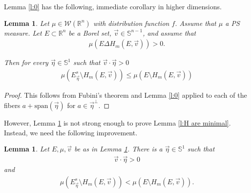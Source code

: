 \documentclass[12pt]{amsart}
\numberwithin{equation}{section}
\theoremstyle{plain}
\newtheorem{lemma}[theorem]{Lemma}
\theoremstyle{definition}
\begin{document}
Lemma \ref{l:0} has the following, immediate corollary in higher dimensions.

\begin{lemma}\label{l:1}
Let $\mu \in \mathscr{W}(\mathbb{R}^n)$ with distribution function $f$.  Assume that $\mu$ a PS measure.  Let $E \subset \mathbb{R}^n$ be a Borel set, $\vec{v} \in \mathbb{S}^{n-1}$, and assume that 
\begin{align*}
    \mu(E \Delta H_m(E, \vec{v}))>0.
\end{align*}

Then for every $\vec{\eta} \in \mathbb{S}^1$ such that $\vec{v} \cdot \vec{\eta}>0$
\begin{align}
    \mu(E^s_{\vec{\eta}} \setminus H_{m}(E, \vec{v})) \le \mu(E \setminus H_{m}(E, \vec{v})) 
\end{align}
\end{lemma}

\begin{proof}
    This follows from Fubini's theorem and Lemma \ref{l:0} applied to each of the fibers $a + \text{span}(\vec{\eta})$ for $a \in \vec{\eta}^{\perp}$.
\end{proof}

However, Lemma \ref{l:1} is not strong enough to prove Lemma \ref{l:H are minimal}. Instead, we need the following improvement.

\begin{lemma}\label{l:measure reduction}
    Let $E, \mu, \vec{v}$ be as in Lemma \ref{l:1}.  There is a $\vec{\eta} \in \mathbb{S}^1$ such that 
\begin{align*}
    \vec{v} \cdot \vec{\eta}>0
\end{align*}
and 
\begin{align}
    \mu(E^s_{\vec{\eta}} \setminus H_{m}(E, \vec{v})) <  \mu(E \setminus H_{m}(E, \vec{v})). 
\end{align}
\end{lemma}
\end{document}
